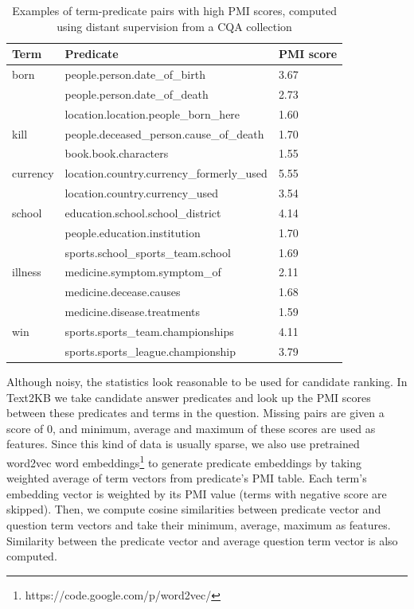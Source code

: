 \begin{table}
\caption{Examples of term-predicate pairs with high PMI scores, computed using distant supervision from a CQA collection}
\label{table:cqa_npmi}
\begin{tabular}{| p{1cm} | p{5.5cm} | p{0.75cm} |}
\hline
Term & Predicate & PMI score\\
\hline
born & people.person.date\_of\_birth & 3.67\\
 & people.person.date\_of\_death & 2.73\\
 & location.location.people\_born\_here & 1.60\\
\hline
kill & people.deceased\_person.cause\_of\_death & 1.70\\
& book.book.characters & 1.55\\
\hline
currency & location.country.currency\_formerly\_used & 5.55 \\
& location.country.currency\_used & 3.54 \\
\hline
school & education.school.school\_district & 4.14 \\
& people.education.institution & 1.70\\
& sports.school\_sports\_team.school & 1.69 \\
\hline
illness & medicine.symptom.symptom\_of & 2.11\\
& medicine.decease.causes & 1.68\\
& medicine.disease.treatments & 1.59\\
\hline
win & sports.sports\_team.championships & 4.11\\
& sports.sports\_league.championship & 3.79\\
\hline
\end{tabular}
\end{table}

Although noisy, the statistics look reasonable to be used for candidate ranking.
In Text2KB we take candidate answer predicates and look up the  PMI scores between these predicates and terms in the question.
Missing pairs are given a score of 0, and minimum, average and maximum of these scores are used as features.
Since this kind of data is usually sparse, we also use pretrained word2vec word embeddings\footnote{https://code.google.com/p/word2vec/} to generate predicate embeddings by taking weighted average of term vectors from predicate's PMI table.
Each term's embedding vector is weighted by its PMI value (terms with negative score are skipped).
Then, we compute cosine similarities between predicate vector and question term vectors and take their minimum, average, maximum as features.
Similarity between the predicate vector and average question term vector is also computed.


